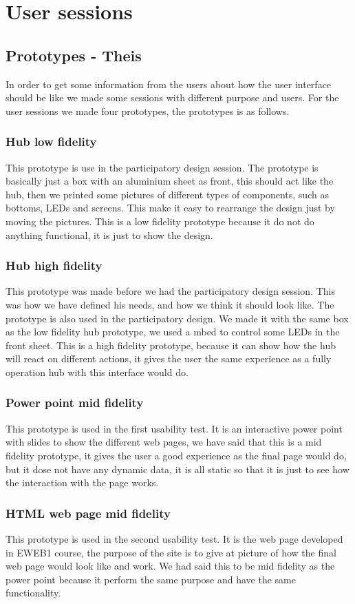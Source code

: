 \chapter{User sessions}
\section{Prototypes - Theis}
In order to get some information from the users about how the user interface should be like we made some sessions with different purpose and users. For the user sessions we made four prototypes, the prototypes is as follows.

\subsection{Hub low fidelity}
This prototype is use in the participatory design session. The prototype is basically just a box with an aluminium sheet as front, this should act like the hub, then we printed some pictures of different types of components, such as bottoms, LEDs and screens. This make it easy to rearrange the design just by moving the pictures. This is a low fidelity prototype because it do not do anything functional, it is just to show the design.
\subsection{Hub high fidelity}
This prototype was made before we had the participatory design session. This was how we have defined his needs, and how we think it should look like. The prototype is also used in the participatory design. We made it with the same box as the low fidelity hub prototype, we used a mbed to control some LEDs in the front sheet. This is a high fidelity prototype, because it can show how the hub will react on different actions, it gives the user the same experience as a fully operation hub with this interface would do.
\subsection{Power point mid fidelity}
This prototype is used in the first usability test. It is an interactive power point with slides to show the different web pages, we have said that this is a mid fidelity prototype, it gives the user a good experience as the final page would do, but it dose not have any dynamic data, it is all static so that it is just to see how the interaction with the page works.
\subsection{HTML web page mid fidelity}
This prototype is used in the second usability test. It is the web page developed in EWEB1 course, the purpose of the site is to give at picture of how the final web page would look like and work. We had said this to be mid fidelity as the power point because it perform the same purpose and have the same functionality.

